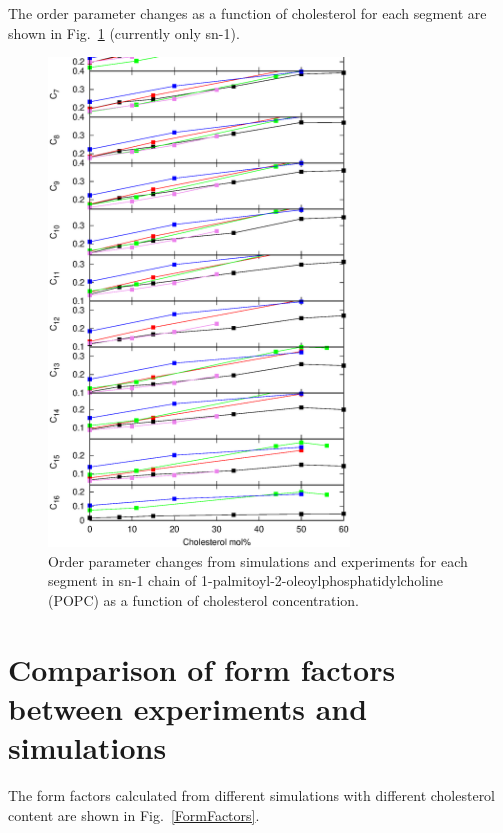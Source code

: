 \documentclass[aps,prl,superscriptaddress,twocolumn]{revtex4}
\begin{document}
The order parameter changes as a function of cholesterol for each segment are shown in Fig.~\ref{OrderParametersCHOLchanges}
(currently only sn-1).

 \begin{figure}[]
  \centering
  \includegraphics[width=8cm]{../FIGS/OrderParametersCHANGEScholSN1.eps}

  \caption{\label{OrderParametersCHOLchanges}
    Order parameter changes from simulations and experiments for each segment in sn-1 chain of  1-palmitoyl-2-oleoylphosphatidylcholine (POPC) as a function of cholesterol concentration.}

\end{figure}

\section{Comparison of form factors between experiments and simulations}
The form factors calculated from different simulations with different cholesterol content are shown in 
Fig.~\ref{FormFactors}.
\end{document}

